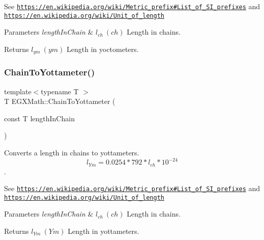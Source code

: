 See \href{https://en.wikipedia.org/wiki/Metric_prefix#List_of_SI_prefixes}{\tt https\+://en.\+wikipedia.\+org/wiki/\+Metric\+\_\+prefix\#\+List\+\_\+of\+\_\+\+S\+I\+\_\+prefixes} and \href{https://en.wikipedia.org/wiki/Unit_of_length}{\tt https\+://en.\+wikipedia.\+org/wiki/\+Unit\+\_\+of\+\_\+length} 
\begin{DoxyParams}{Parameters}
{\em length\+In\+Chain} & $ l_{ch}\ (ch)$ Length in chains. \\
\hline
\end{DoxyParams}
\begin{DoxyReturn}{Returns}
$ l_{ym}\ (ym)$ Length in yoctometers. 
\end{DoxyReturn}
\mbox{\label{group___e_g_x_math-_conversions-_length_conversions-_imperial-_chain-_s_i_ga033ed288c43416b74a897a3902cc49b2}} 
\subsubsection{\texorpdfstring{Chain\+To\+Yottameter()}{ChainToYottameter()}}
{\footnotesize\ttfamily template$<$typename T $>$ \\
T E\+G\+X\+Math\+::\+Chain\+To\+Yottameter (\begin{DoxyParamCaption}\item[{const T}]{length\+In\+Chain }\end{DoxyParamCaption})}



Converts a length in chains to yottameters. \[ l_{Ym}=0.0254 * 792 * l_{ch} * 10^{-24} \]. 

See \href{https://en.wikipedia.org/wiki/Metric_prefix#List_of_SI_prefixes}{\tt https\+://en.\+wikipedia.\+org/wiki/\+Metric\+\_\+prefix\#\+List\+\_\+of\+\_\+\+S\+I\+\_\+prefixes} and \href{https://en.wikipedia.org/wiki/Unit_of_length}{\tt https\+://en.\+wikipedia.\+org/wiki/\+Unit\+\_\+of\+\_\+length} 
\begin{DoxyParams}{Parameters}
{\em length\+In\+Chain} & $ l_{ch}\ (ch)$ Length in chains. \\
\hline
\end{DoxyParams}
\begin{DoxyReturn}{Returns}
$ l_{Ym}\ (Ym)$ Length in yottameters. 
\end{DoxyReturn}
\mbox{\label{group___e_g_x_math-_conversions-_length_conversions-_imperial-_chain-_s_i_ga5c9f25b27d059b6b458111270a20209a}} 
